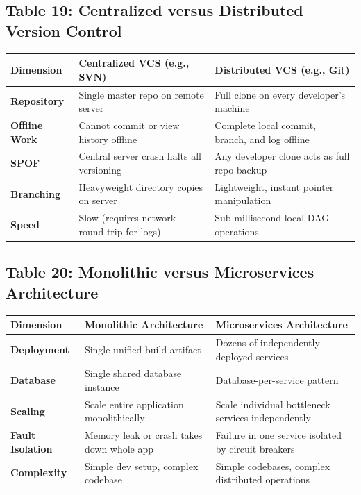 \subsection*{Table 19: Centralized versus Distributed Version Control}
\begin{center}
\small
\begin{tabularx}{\textwidth}{lXX}
\toprule
\textbf{Dimension} & \textbf{Centralized VCS (e.g., SVN)} & \textbf{Distributed VCS (e.g., Git)} \\
\midrule
\textbf{Repository} & Single master repo on remote server & Full clone on every developer's machine \\
\textbf{Offline Work} & Cannot commit or view history offline & Complete local commit, branch, and log offline \\
\textbf{SPOF} & Central server crash halts all versioning & Any developer clone acts as full repo backup \\
\textbf{Branching} & Heavyweight directory copies on server & Lightweight, instant pointer manipulation \\
\textbf{Speed} & Slow (requires network round-trip for logs) & Sub-millisecond local DAG operations \\
\bottomrule
\end{tabularx}
\end{center}

\subsection*{Table 20: Monolithic versus Microservices Architecture}
\begin{center}
\small
\begin{tabularx}{\textwidth}{lXX}
\toprule
\textbf{Dimension} & \textbf{Monolithic Architecture} & \textbf{Microservices Architecture} \\
\midrule
\textbf{Deployment} & Single unified build artifact & Dozens of independently deployed services \\
\textbf{Database} & Single shared database instance & Database-per-service pattern \\
\textbf{Scaling} & Scale entire application monolithically & Scale individual bottleneck services independently \\
\textbf{Fault Isolation} & Memory leak or crash takes down whole app & Failure in one service isolated by circuit breakers \\
\textbf{Complexity} & Simple dev setup, complex codebase & Simple codebases, complex distributed operations \\
\bottomrule
\end{tabularx}
\end{center}


